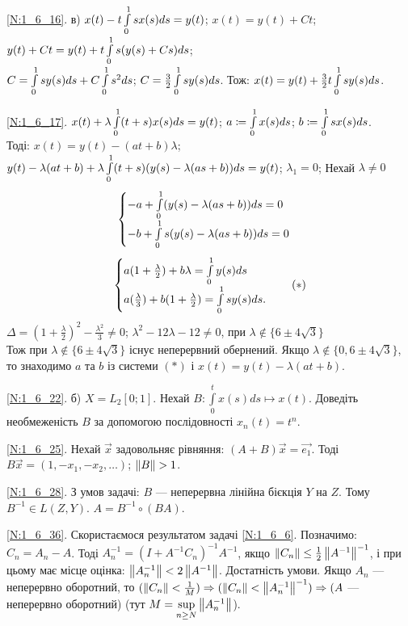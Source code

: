 \noindent\ref{N:1_6_16}. в) $x(t) - t\int\limits_{0}^{1}sx(s)ds = y(t)$;\; $x(t) = y(t) +Ct$;\\
$y(t) +Ct = y(t) + t \int\limits_{0}^{1}s(y(s) + Cs)ds$;\\
$C = \int\limits_{0}^{1}sy(s)ds + C \int\limits_{0}^{1}s^2ds$;\;
$C = \frac{3}{2} \int\limits_{0}^{1}sy(s)ds$.\; Тож:
$x(t) = y(t) + \frac{3}{2}t\int\limits_{0}^{1}sy(s)ds$. 

\noindent\ref{N:1_6_17}. $x(t) + \lambda \int\limits_{0}^{1}(t+s)x(s)ds = y(t)$;\;
$a \coloneqq \int\limits_{0}^{1} x(s) ds$;\; $b \coloneqq \int\limits_{0}^{1} sx(s)ds$.\\
Тоді: $x(t) = y(t) - (at +b)\lambda$;\;
$y(t) - \lambda(at + b) + \lambda\int\limits_{0}^{1}(t+s)(y(s) - \lambda(as+b))ds = y(t)$;
$\lambda_1 = 0$; Нехай $\lambda \neq 0$
\[\begin{cases}
    - a + \int\limits_{0}^{1}(y(s) - \lambda(as + b))ds = 0\\
    - b + \int\limits_{0}^{1}s(y(s) - \lambda(as + b))ds = 0
\end{cases}\]
\[\begin{cases}
    a(1 + \frac{\lambda}{2}) + b\lambda = \int\limits_{0}^{1}y(s)ds\\
    a(\frac{\lambda}{3}) + b(1 + \frac{\lambda}{2}) = \int\limits_{0}^{1} sy(s)ds.
\end{cases}
\quad (*)\]
$\Delta = (1 + \frac{\lambda}{2})^2 - \frac{\lambda^2}{3} \neq 0$; \;
$\lambda^2 - 12\lambda -12 \neq 0$, при
$\lambda \not\in \{6 \pm 4\sqrt{3}\}$\\
Тож при $\lambda \not\in \{6 \pm 4\sqrt{3}\}$ існує неперервний обернений.
Якщо $\lambda \not\in \{0, 6 \pm 4\sqrt{3}\}$, то знаходимо $a$ та $b$ із системи $(*)$
і $x(t) = y(t) - \lambda(at+b)$.

\noindent\ref{N:1_6_22}. б) $X = L_2 [0; 1]$. Нехай $B: \int\limits_0^t x(s) ds \mapsto x(t)$. Доведіть необмеженість
$B$ за допомогою послідовності $x_n(t) = t^n$.

\noindent\ref{N:1_6_25}. Нехай $\vec{x}$ задовольняє рівняння: $(A+B) \vec{x} = \vec{e_1}$.
Тоді $B \vec{x} = (1, -x_1, -x_2, \dots)$; $\left\lVert B\right\rVert > 1$.

\noindent\ref{N:1_6_28}. З умов задачі: $B$ --- неперервна лінійна бієкція $Y$ на $Z$. Тому
$B^{-1} \in L(Z, Y)$. $A = B^{-1} \circ (BA)$.

\noindent\ref{N:1_6_36}. Скористаємося результатом задачі \ref{N:1_6_6}. Позначимо: $C_n = A_n - A$.
Тоді $A_n^{-1} = (I+A^{-1}C_n)^{-1} A^{-1}$, якщо $\left\lVert C_n\right\rVert \leq \frac{1}{2} \left\lVert A^{-1}\right\rVert^{-1}$, і при цьому має місце
оцінка: $\left\lVert A_n^{-1}\right\rVert < 2\left\lVert A^{-1}\right\rVert$.
Достатність умови. Якщо $A_n$ --- неперервно оборотний, то $(\left\lVert C_n\right\rVert<\frac{1}{M}) \Rightarrow (\left\lVert C_n\right\rVert < \left\lVert A_n^{-1}\right\rVert^{-1}) \Rightarrow (A$
 --- неперервно оборотний) (тут $M = \sup\limits_{n \geq N} \left\lVert A_n^{-1}\right\rVert$).

